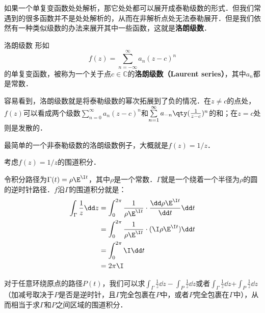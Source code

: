 

如果一个单复变函数处处解析，那它处处都可以展开成泰勒级数的形式．但我们常遇到的很多函数并不是处处解析的，从而在非解析点处无法泰勒展开．但是我们依然有一种类似级数的办法来展开其中一些函数，这就是\textbf{洛朗级数}．

\begin{definition}{洛朗级数}
形如
\begin{equation}
f(z)=\sum\limits_{n=-\infty}^{\infty} a_n(z-c)^n
\end{equation}
的单复变函数，被称为一个关于点$c\in\mathbb{C}$的\textbf{洛朗级数（Laurent series）}，其中$a_n$都是常数．


\end{definition}

容易看到，洛朗级数就是将泰勒级数的幂次拓展到了负的情况．在$z\neq c$的点处，$f(z)$可以看成两个级数$\sum\limits_{n=0}^{\infty} a_n(z-c)^n$和$\sum\limits_{n=1}^{\infty} a_{-n}\qty(\frac{1}{z-c})^n$的和；在$z=c$处则是发散的．

最简单的一个非泰勒级数的洛朗级数例子，大概就是$f(z)=1/z$．

\begin{example}{}
考虑$f(z)=1/z$的围道积分．

令积分路径为$\Gamma(t)=\rho\E^{\I t}$，其中$\rho$是一个常数．$\Gamma$就是一个绕着一个半径为$\rho$的圆的逆时针路径．$f$沿$\Gamma$的围道积分就是：
\begin{equation}
\begin{aligned}
\int_{\Gamma}\frac{1}{z}\dd z&=\int^{2\pi}_0\frac{1}{\rho\E^{\I t}}\cdot\frac{\dd\rho\E^{\I t}}{\dd t}\dd t\\
&=\int_0^{2\pi}\frac{1}{\rho\E^{\I t}}\cdot (\I \rho \E^{\I t})\dd t\\
&=\int_0^{2\pi}\I\dd t\\
&=2\pi\I
\end{aligned}
\end{equation}

对于任意环绕原点的路径$P(t)$，我们可以求$\int_{\Gamma}\frac{1}{z}\dd z-\int_{P}\frac{1}{z}\dd z$或者$\int_{\Gamma}\frac{1}{z}\dd z$+$\int_{P}\frac{1}{z}\dd z$（加减号取决于$P$是否是逆时针，且$\Gamma$完全包裹在$P$中，或者$P$完全包裹在$\Gamma$中），从而相当于求$\Gamma$和$P$之间区域的围道积分．

\end{example}


















